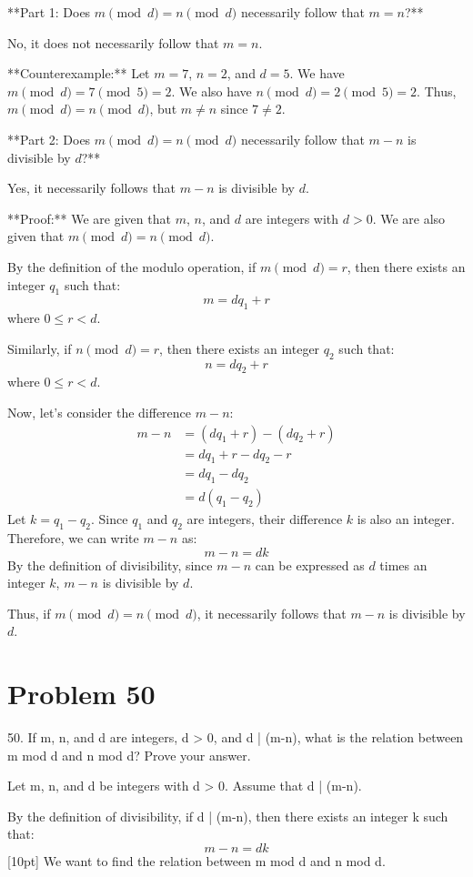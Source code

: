 \documentclass{article}
\begin{document}
**Part 1: Does $m \pmod{d} = n \pmod{d}$ necessarily follow that $m=n$?**

No, it does not necessarily follow that $m=n$.

**Counterexample:**
Let $m=7$, $n=2$, and $d=5$.
We have $m \pmod{d} = 7 \pmod{5} = 2$.
We also have $n \pmod{d} = 2 \pmod{5} = 2$.
Thus, $m \pmod{d} = n \pmod{d}$, but $m \neq n$ since $7 \neq 2$.

**Part 2: Does $m \pmod{d} = n \pmod{d}$ necessarily follow that $m-n$ is divisible by $d$?**

Yes, it necessarily follows that $m-n$ is divisible by $d$.

**Proof:**
We are given that $m$, $n$, and $d$ are integers with $d > 0$.
We are also given that $m \pmod{d} = n \pmod{d}$.

By the definition of the modulo operation, if $m \pmod{d} = r$, then there exists an integer $q_1$ such that:
$$ m = dq_1 + r $$
where $0 \leq r < d$.

Similarly, if $n \pmod{d} = r$, then there exists an integer $q_2$ such that:
$$ n = dq_2 + r $$
where $0 \leq r < d$.

Now, let's consider the difference $m-n$:
\begin{align*} m - n &= (dq_1 + r) - (dq_2 + r) \\ &= dq_1 + r - dq_2 - r \\ &= dq_1 - dq_2 \\ &= d(q_1 - q_2) \end{align*}
Let $k = q_1 - q_2$. Since $q_1$ and $q_2$ are integers, their difference $k$ is also an integer.
Therefore, we can write $m-n$ as:
$$ m - n = dk $$
By the definition of divisibility, since $m-n$ can be expressed as $d$ times an integer $k$, $m-n$ is divisible by $d$.

Thus, if $m \pmod{d} = n \pmod{d}$, it necessarily follows that $m-n$ is divisible by $d$.

\newpage

\section*{Problem 50}
50. If m, n, and d are integers, d > 0, and d | (m-n), what is the relation between m mod d and n mod d? Prove your answer.

Let m, n, and d be integers with d > 0.
Assume that d | (m-n).

By the definition of divisibility, if d | (m-n), then there exists an integer k such that:
$$m - n = dk$$
[10pt]
We want to find the relation between m mod d and n mod d.
\end{document}
